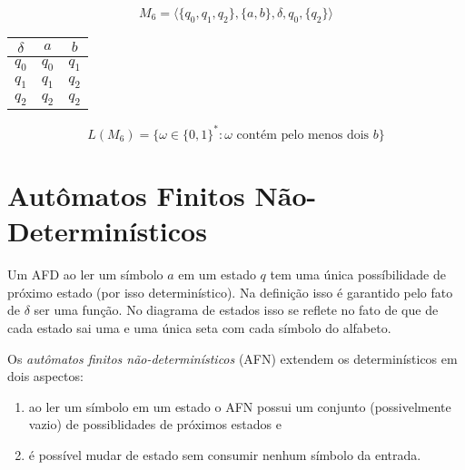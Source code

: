 \begin{example}
  \begin{displaymath}
    M_6 = \langle \{q_0, q_1, q_2\}, \{a,b\}, \delta, q_0, \{q_2\}\rangle
  \end{displaymath}

  \begin{center}
  \begin{tabular}{c|cc}
    $\delta$ & $a$ & $b$ \\
    \hline
    $q_0$ & $q_0$ & $q_1$\\
    $q_1$ & $q_1$ & $q_2$\\
    $q_2$ & $q_2$ & $q_2$\\
  \end{tabular}
  \end{center}

  \begin{center}
  \end{center}

  \begin{displaymath}
    L(M_6) = \{\omega \in \{0,1\}^* : \omega \textrm{ contém pelo menos dois } b \}
  \end{displaymath}
\end{example}

\section{Autômatos Finitos Não-Determinísticos}
\label{sec:afn}

Um AFD ao ler um símbolo $a$ em um estado $q$ tem uma única possíbilidade de próximo estado (por isso determinístico).
Na definição isso é garantido pelo fato de $\delta$ ser uma função.
No diagrama de estados isso se reflete no fato de que de cada estado sai uma e uma única seta com cada símbolo do alfabeto.

Os {\em autômatos finitos não-determinísticos} (AFN) extendem os determinísticos em dois aspectos:
\begin{enumerate}
\item ao ler um símbolo em um estado o AFN possui um conjunto (possivelmente vazio) de possiblidades de próximos estados e
\item é possível mudar de estado sem consumir nenhum símbolo da entrada.
\end{enumerate}

